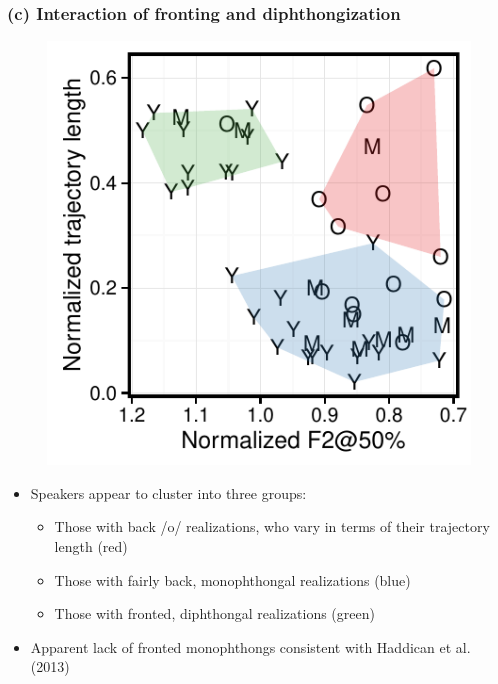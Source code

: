\documentclass[a0,final]{a0poster}
\begin{document}
\begin{multicols*}{4}
\subsubsection*{(c) Interaction of fronting and diphthongization}
\begin{minipage}{0.13\textwidth}
\vspace*{-3cm}
\begin{figure}[H]
\includegraphics[scale=1.9]{o_fronting_dip.pdf}
\end{figure}
\end{minipage}
\begin{minipage}{0.12\textwidth}
\raggedright
\vspace*{.5cm}
\begin{itemize}
\item{Speakers appear to cluster into three groups:\begin{itemize}
\item{Those with back /o/ realizations, who vary in terms of their trajectory length (red)}
\item{Those with fairly back, monophthongal realizations (blue)}
\item{Those with fronted, diphthongal realizations (green)}\end{itemize}}
\item{Apparent lack of fronted monophthongs consistent with Haddican et al. (2013)}
\end{itemize}
\end{minipage}
\vspace*{-1cm}

\end{multicols*}
\end{document}
